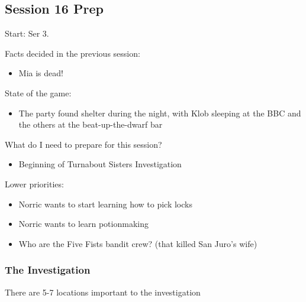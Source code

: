 \subsection{Session 16 Prep}
Start: Ser 3.

Facts decided in the previous session:
\begin{itemize}
\item Mia is dead!
\end{itemize}

State of the game:
\begin{itemize}
\item The party found shelter during the night, with Klob sleeping at the BBC and the others at the beat-up-the-dwarf bar
\end{itemize}

What do I need to prepare for this session?
\begin{itemize}
\item Beginning of Turnabout Sisters Investigation
\end{itemize}

Lower priorities:
\begin{itemize}
\item Norric wants to start learning how to pick locks
\item Norric wants to learn potionmaking
\item Who are the Five Fists bandit crew? (that killed San Juro's wife)
\end{itemize}



\subsubsection{The Investigation}
There are 5-7 locations important to the investigation

